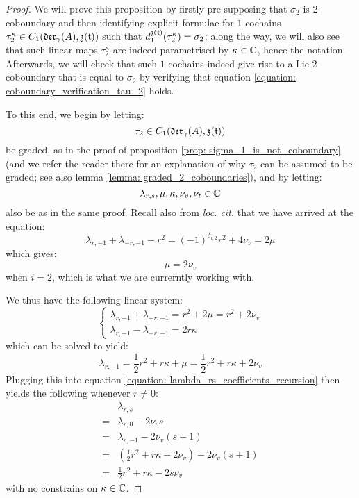             \begin{proof}
                We will prove this proposition by firstly pre-supposing that $\sigma_2$ is $2$-coboundary and then identifying explicit formulae for $1$-cochains $\tau_2^{\kappa} \in C_1(\mathfrak{der}_{\gamma}(A), \mathfrak{z}(\mathfrak{t}))$ such that $d_1^{\mathfrak{z}(\mathfrak{t})}(\tau_2^{\kappa}) = \sigma_2$; along the way, we will also see that such linear maps $\tau_2^{\kappa}$ are indeed parametrised by $\kappa \in \mathbb{C}$, hence the notation. Afterwards, we will check that such $1$-cochains indeed give rise to a Lie $2$-coboundary that is equal to $\sigma_2$ by verifying that equation \eqref{equation: coboundary_verification_tau_2} holds.
                
                To this end, we begin by letting:
                    $$\tau_2 \in C_1(\mathfrak{der}_{\gamma}(A), \mathfrak{z}(\mathfrak{t}))$$
                be graded, as in the proof of proposition \ref{prop: sigma_1_is_not_coboundary} (and we refer the reader there for an explanation of why $\tau_2$ can be assumed to be graded; see also lemma \ref{lemma: graded_2_coboundaries}), and by letting:
                    $$\lambda_{r, s}, \mu, \kappa, \nu_v, \nu_t \in \mathbb{C}$$
                also be as in the same proof. Recall also from \textit{loc. cit.} that we have arrived at the equation:
                    $$\lambda_{r, -1} + \lambda_{-r, -1} - r^2 = (-1)^{\delta_{i, 2}} r^2 + 4\nu_v = 2\mu$$
                which gives:
                    $$\mu = 2\nu_v$$
                when $i = 2$, which is what we are currerntly working with.
                
                We thus have the following linear system:
                    $$
                        \begin{cases}
                            \lambda_{r, -1} + \lambda_{-r, -1} = r^2 + 2\mu = r^2 + 2 \nu_v
                            \\
                            \lambda_{r, -1} - \lambda_{-r, -1} = 2r\kappa
                        \end{cases}
                    $$
                which can be solved to yield:
                    $$\lambda_{r, -1} = \frac12 r^2 + r\kappa + \mu = \frac12 r^2 + r\kappa + 2\nu_v$$
                Plugging this into equation \eqref{equation: lambda_rs_coefficients_recursion} then yields the following whenever $r \not = 0$:
                    $$
                        \begin{aligned}
                            & \lambda_{r, s}
                            \\
                            = & \lambda_{r, 0} - 2\nu_v s
                            \\
                            = & \lambda_{r, -1} - 2 \nu_v (s + 1)
                            \\
                            = & \left( \frac12 r^2 + r\kappa + 2\nu_v \right) - 2 \nu_v (s + 1)
                            \\
                            = & \frac12 r^2 + r\kappa - 2s \nu_v
                        \end{aligned} 
                    $$
                with no constrains on $\kappa \in \mathbb{C}$. 


\end{proof}
